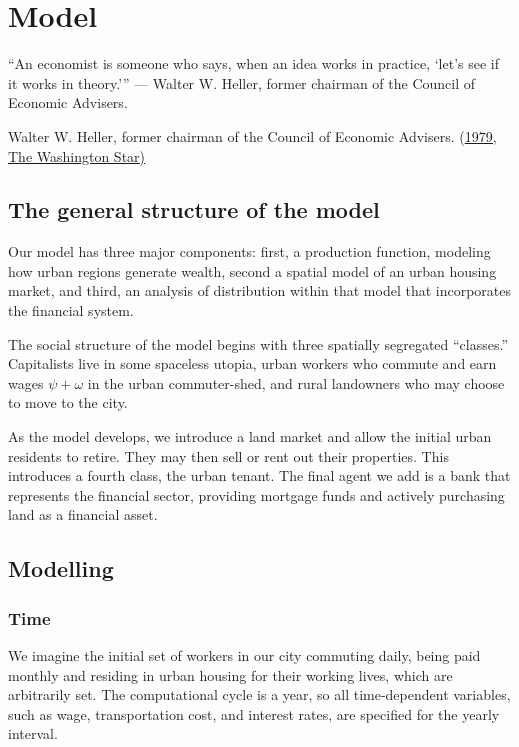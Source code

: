 \chapter{Model} \label{chapter-model}
\epigraph{“An economist is someone who says, when an idea works in practice, ‘let’s see if it works in theory.'”
— Walter W. Heller, former chairman of the Council of Economic Advisers.}{ Walter W. Heller, former chairman of the Council of Economic Advisers. (\href{https://quoteinvestigator.com/2015/08/30/practice/}{1979, The Washington Star)}}


\section{The general structure of the model}
Our model has three major components: first, a production function, modeling how urban regions generate wealth,  second a spatial model of an urban housing market, and third, an analysis of distribution within that model that incorporates the financial system.

The social structure of the model begins with  three spatially segregated ``classes.'' Capitalists live in some spaceless utopia, urban workers who commute and earn wages $\psi + \omega$ in the urban commuter-shed, and  rural landowners who may choose to move to the city. %

As the model develops, we introduce a land market and allow  the initial urban residents  to retire. They may then  sell or rent out their properties. This introduces a fourth class, the urban tenant. The final agent we add is a bank that represents 
the financial sector, providing mortgage funds and actively purchasing land as a financial asset.



\section{Modelling} 
\subsection{Time}
We imagine the initial set of workers in our city commuting daily, being paid monthly and residing in urban housing for their working lives, which are arbitrarily set. The computational cycle is a year, so all time-dependent variables, such as  wage, transportation cost, and interest rates, are specified for the yearly interval. 



